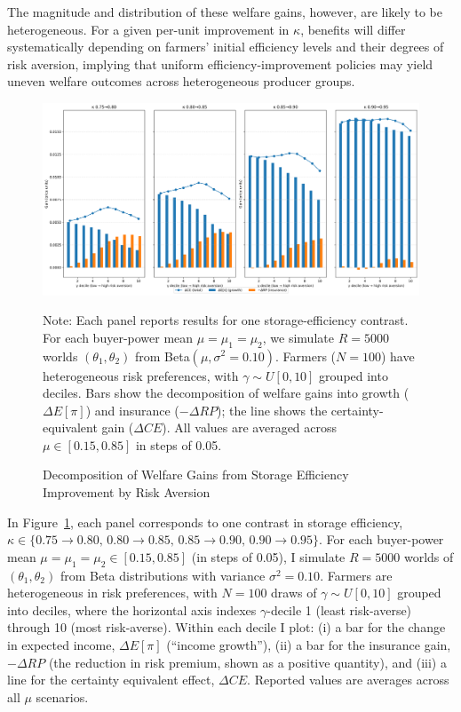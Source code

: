 The magnitude and distribution of these welfare gains, however, are likely to be heterogeneous. For a given per-unit improvement in $\kappa$, benefits will differ systematically depending on farmers' initial efficiency levels and their degrees of risk aversion, implying that uniform efficiency-improvement policies may yield uneven welfare outcomes across heterogeneous producer groups.

\begin{figure}[ht]
    \centering
    \includegraphics[width=\linewidth]{model_figures/storage_subsidy_gain_decomposition.png}
    \caption{Decomposition of Welfare Gains from Storage Efficiency Improvement by Risk Aversion}
    \label{fig:storage_subsidy_gain_decomposition}
    \begin{tablenotes}[flushleft]
    \footnotesize
    \item Note: Each panel reports results for one storage-efficiency contrast. For each buyer-power mean $\mu=\mu_1=\mu_2$, we simulate $R=5000$ worlds $(\theta_1,\theta_2)$ from Beta$(\mu,\sigma^2=0.10)$. Farmers ($N=100$) have heterogeneous risk preferences, with $\gamma \sim U[0,10]$ grouped into deciles. Bars show the decomposition of welfare gains into growth ($\Delta E[\pi]$) and insurance ($-\Delta RP$); the line shows the certainty-equivalent gain ($\Delta CE$). All values are averaged across $\mu \in [0.15,0.85]$ in steps of 0.05.
    \end{tablenotes}
\end{figure}

In Figure~\ref{fig:storage_subsidy_gain_decomposition}, each panel corresponds to one contrast in storage efficiency, $\kappa \in \{0.75\to0.80,\,0.80\to0.85,\,0.85\to0.90,\,0.90\to0.95\}$. For each buyer-power mean $\mu=\mu_1=\mu_2 \in [0.15,0.85]$ (in steps of 0.05), I simulate $R=5000$ worlds of $(\theta_1,\theta_2)$ from Beta distributions with variance $\sigma^2=0.10$. Farmers are heterogeneous in risk preferences, with $N=100$ draws of $\gamma \sim U[0,10]$ grouped into deciles, where the horizontal axis indexes $\gamma$-decile 1 (least risk-averse) through 10 (most risk-averse). Within each decile I plot: (i) a bar for the change in expected income, $\Delta E[\pi]$ (``income growth''), (ii) a bar for the insurance gain, $-\Delta RP$ (the reduction in risk premium, shown as a positive quantity), and (iii) a line for the certainty equivalent effect, $\Delta CE$. Reported values are averages across all $\mu$ scenarios.

